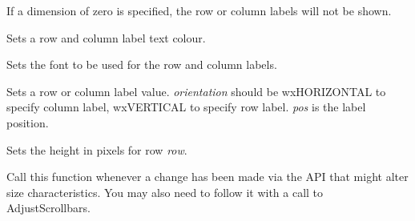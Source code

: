 If a dimension of zero is specified, the row or column labels will not be
shown.

\label{wxgridsetlabeltextcolour}


Sets a row and column label text colour.

\label{wxgridsetlabeltextfont}


Sets the font to be used for the row and column labels.

\label{wxgridsetlabelvalue}


Sets a row or column label value. {\it orientation} should
be wxHORIZONTAL to specify column label, wxVERTICAL to specify row label.\rtfsp
{\it pos} is the label position.

\label{wxgridsetrowheight}


Sets the height in pixels for row {\it row}.

\label{wxgridupdatedimensions}


Call this function whenever a change has been made via the API that
might alter size characteristics. You may also need to follow it with
a call to AdjustScrollbars.


